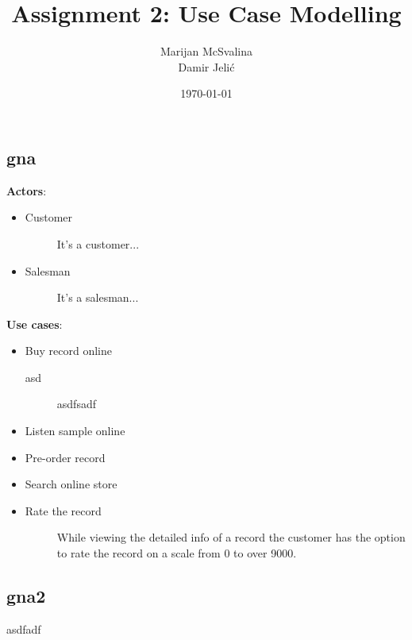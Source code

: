 \documentclass[12pt, titlepage]{article}
\title{Assignment 2: Use Case Modelling}
\date{\today}
\author{Marijan McSvalina \\ Damir Jelić}
\begin{document}
\maketitle 

\setcounter{section}{2}
\subsection{gna}
{\bf Actors}:
\begin{itemize}
\item
    Customer
    \begin{description}
    \item[] It's a customer...
    \end{description}
\item
    Salesman
    \begin{description}
    \item[] It's a salesman...
    \end{description}
\end{itemize}
{\bf Use cases}:
\begin{itemize}
\item
    Buy record online
    \begin{description}
    \item[asd]
    asdfsadf
    \end{description}
\item
    Listen sample online
\item
    Pre-order record
\item 
    Search online store
\item 
    Rate the record
    \begin{description}
    \item[] While viewing the detailed info of a record the customer has the option to rate
    the record on a scale from 0 to over 9000.
    \end{description}
\end{itemize}
\subsection{gna2}
asdfadf
\end{document}
